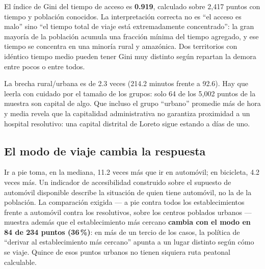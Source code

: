 \documentclass[11pt,a4paper]{article}
\begin{document}
El índice de Gini del tiempo de acceso es \textbf{0.919}, calculado sobre
2{,}417 puntos con tiempo y población conocidos. La interpretación correcta no
es ``el acceso es malo'' sino ``el tiempo total de viaje está extremadamente
concentrado'': la gran mayoría de la población acumula una fracción mínima del
tiempo agregado, y ese tiempo se concentra en una minoría rural y amazónica.
Dos territorios con idéntico tiempo medio pueden tener Gini muy distinto según
repartan la demora entre pocos o entre todos.

\begin{table}[H]
\centering
\caption{Contraste de acceso entre zonas urbanas y rurales.}
\label{tab:urbano-rural}
\footnotesize

\end{table}

La brecha rural/urbana es de 2.3 veces (214.2 minutos frente a 92.6). Hay que
leerla con cuidado por el tamaño de los grupos: solo 64 de los 5{,}002 puntos
de la muestra son capital de algo. Que incluso el grupo ``urbano'' promedie más
de hora y media revela que la capitalidad administrativa no garantiza
proximidad a un hospital resolutivo: una capital distrital de Loreto sigue
estando a días de uno.

\subsection{El modo de viaje cambia la respuesta}

\begin{table}[H]
\centering
\caption{Tiempo al establecimiento resolutivo más cercano según modo.}
\label{tab:modos}
\footnotesize

\end{table}

Ir a pie toma, en la mediana, 11.2 veces más que ir en automóvil; en bicicleta,
4.2 veces más. Un indicador de accesibilidad construido sobre el supuesto de
automóvil disponible describe la situación de quien tiene automóvil, no la de
la población. La comparación exigida --- a pie contra todos los
establecimientos frente a automóvil contra los resolutivos, sobre los centros
poblados urbanos --- muestra además que el establecimiento más cercano
\textbf{cambia con el modo en 84 de 234 puntos (36\,\%)}: en más de un tercio
de los casos, la política de ``derivar al establecimiento más cercano'' apunta
a un lugar distinto según cómo se viaje. Quince de esos puntos urbanos no
tienen siquiera ruta peatonal calculable.
\end{document}
